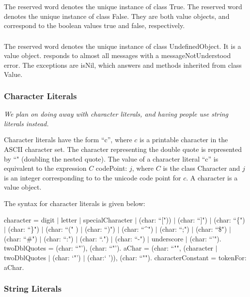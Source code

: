 \documentclass{article}
\newcommand{\code}[1]{{\sf #1}}
\begin{document}
The reserved word \TRUE{ } denotes the unique instance of class \code{True}. The reserved word \FALSE{ } denotes the unique instance of class \code{False}. They are both value objects, and correspond to the boolean values true and false, respectively.  

\subsubsection{\NIL}
\label{nil}

The reserved word \NIL{ } denotes the unique instance of class \code{UndefinedObject}. It is a value object. \NIL{ } responds to almost all messages with a \code{messageNotUnderstood} error. The exceptions are \code{isNil}, which answers \TRUE{} and methods inherited from class \code{Value}.


\subsubsection{ Character Literals}
\label{char}

{\it We plan on doing away with character literals, and having people use string literals instead. 
}

Character literals have the form \code{``c''}, where $c$ is a printable character in the ASCII character set. 
The character representing the double quote is represented by \code{``"} (doubling the nested quote).
The value of a character literal \code{``c''} is equivalent to the expression  \code{$C$ codePoint: $j$},  where $C$ is the class \code{Character}  and $j$ is an integer corresponding to to the unicode code point for  $c$. A character is a value object. 

The syntax for character literals is given below:
 
\begin{newspeak}
character = digit $|$ letter $|$ specialCharacter $|$ (char: ``[")) $|$ (char: ``]")  $|$
                (char: ``\{") $|$ (char: ``\}") $|$ (char: ``(" ) $|$ (char: ``)") $|$ 
                (char: ``\^{}") $|$ (char: ``;") $|$ (char: ``\$") $|$ (char: ``\#") $|$
                (char: ``:") $|$ (char: ``.") $|$ (char: ``-") $|$ underscore $|$ (char: ``\textquoteright").   
twoDblQuotes =  (char: ``"'),  (char: ``"').       
aChar = (char: ``"",  (character $|$ twoDblQuotes $|$ (char: `"') $|$ (char:`  ')), (char: ``"").
characterConstant = tokenFor: aChar.
\end{newspeak}
 
\subsubsection{ String Literals}
\label{string}
\end{document}
